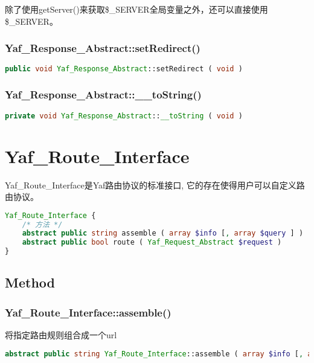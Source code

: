 除了使用getServer()来获取\$\_SERVER全局变量之外，还可以直接使用\$\_SERVER。


\subsection{Yaf\_Response\_Abstract::setRedirect()}


\begin{lstlisting}[language=PHP]
public void Yaf_Response_Abstract::setRedirect ( void )
\end{lstlisting}

\subsection{Yaf\_Response\_Abstract::\_\_toString()}


\begin{lstlisting}[language=PHP]
private void Yaf_Response_Abstract::__toString ( void )
\end{lstlisting}


\chapter{Yaf\_Route\_Interface}

Yaf\_Route\_Interface是Yaf路由协议的标准接口, 它的存在使得用户可以自定义路由协议。




\begin{lstlisting}[language=PHP]
Yaf_Route_Interface {
    /* 方法 */
    abstract public string assemble ( array $info [, array $query ] )
    abstract public bool route ( Yaf_Request_Abstract $request )
}
\end{lstlisting}

\section{Method}

\subsection{Yaf\_Route\_Interface::assemble()}

将指定路由规则组合成一个url



\begin{lstlisting}[language=PHP]
abstract public string Yaf_Route_Interface::assemble ( array $info [, array $query ] )
\end{lstlisting}

